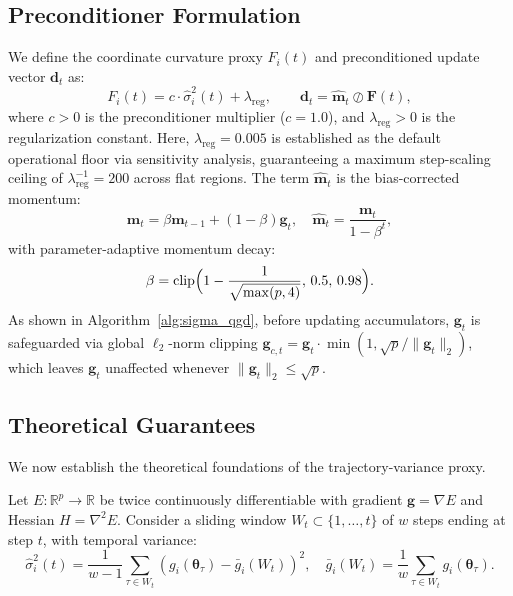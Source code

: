 \documentclass[11pt,a4paper]{article}
\begin{document}
\subsection{Preconditioner Formulation}
We define the coordinate curvature proxy $F_i(t)$ and preconditioned update vector $\mathbf{d}_t$ as:
\begin{equation}
F_i(t) = c \cdot \hat{\sigma}_i^2(t) + \lambda_{\text{reg}}, \qquad \mathbf{d}_t = \hat{\mathbf{m}}_t \oslash \mathbf{F}(t),
\label{eq:preconditioned_update}
\end{equation}
where $c > 0$ is the preconditioner multiplier ($c = 1.0$), and $\lambda_{\text{reg}} > 0$ is the regularization constant. Here, $\lambda_{\text{reg}} = 0.005$ is established as the default operational floor via sensitivity analysis, guaranteeing a maximum step-scaling ceiling of $\lambda_{\text{reg}}^{-1} = 200$ across flat regions. The term $\hat{\mathbf{m}}_t$ is the bias-corrected momentum:
\begin{equation}
\mathbf{m}_t = \beta \mathbf{m}_{t-1} + (1-\beta)\mathbf{g}_t, \quad \hat{\mathbf{m}}_t = \frac{\mathbf{m}_t}{1 - \beta^t},
\label{eq:momentum}
\end{equation}
with parameter-adaptive momentum decay:
\begin{equation}
\beta = \operatorname{clip}\Bigl(1 - \frac{1}{\sqrt{\max(p, 4)}}, \, 0.5, \, 0.98\Bigr).
\label{eq:beta_formula}
\end{equation}
As shown in Algorithm~\ref{alg:sigma_qgd}, before updating accumulators, $\mathbf{g}_t$ is safeguarded via global $\ell_2$-norm clipping $\mathbf{g}_{c,t} = \mathbf{g}_t \cdot \min(1, \sqrt{p}/\|\mathbf{g}_t\|_2)$, which leaves $\mathbf{g}_t$ unaffected whenever $\|\mathbf{g}_t\|_2 \le \sqrt{p}$.

\subsection{Theoretical Guarantees}
We now establish the theoretical foundations of the trajectory-variance proxy.

Let $E: \mathbb{R}^p \to \mathbb{R}$ be twice continuously differentiable with gradient $\mathbf{g} = \nabla E$ and Hessian $H = \nabla^2 E$. Consider a sliding window $W_t \subset \{1, \dots, t\}$ of $w$ steps ending at step $t$, with temporal variance:
\begin{equation}
\hat{\sigma}_i^2(t) = \frac{1}{w-1} \sum_{\tau \in W_t} \left( g_i(\boldsymbol{\theta}_\tau) - \bar{g}_i(W_t) \right)^2, \quad \bar{g}_i(W_t) = \frac{1}{w} \sum_{\tau \in W_t} g_i(\boldsymbol{\theta}_\tau).
\end{equation}
\end{document}
